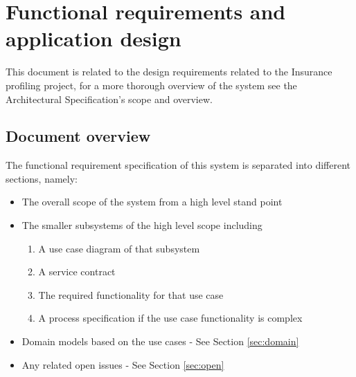 \documentclass{article}
\begin{document}
	\cleardoublepage
	\tableofcontents
	\cleardoublepage
	\begin{versionhistory}
	\end{versionhistory}
	
	\pagebreak


\section{Functional requirements and application design}
This document is related to the design requirements related to the Insurance profiling project, for a more thorough overview of the system see the Architectural Specification's scope and overview.
\subsection{Document overview}
The functional requirement specification of this system is separated into different sections, namely:
\begin{itemize}
	\item The overall scope of the system from a high level stand point
	\item The smaller subsystems of the high level scope including
		\begin{enumerate}
			\item A use case diagram of that subsystem
			\item A service contract 
			\item The required functionality for that use case
			\item A process specification if the use case functionality is complex
		\end{enumerate}
	\item Domain models based on the use cases - See Section \ref{sec:domain}
	\item Any related open issues - See Section \ref{sec:open}
\end{itemize}
\end{document}

